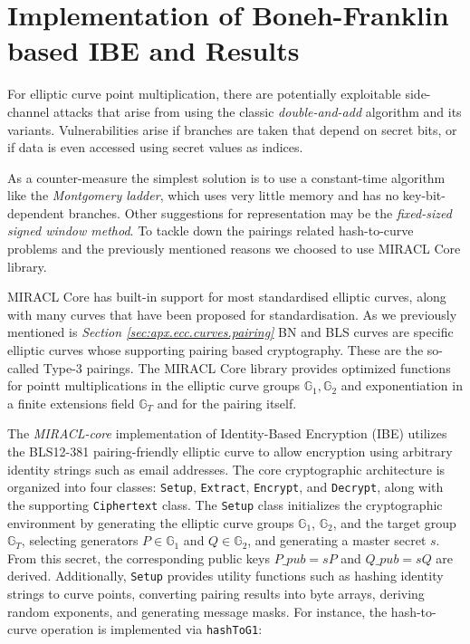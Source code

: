 \section{Implementation of Boneh-Franklin based IBE and Results }
\label{sec:bfibe.imp}


For elliptic curve point multiplication, there are potentially exploitable side-channel attacks that arise from using the classic \textit{double-and-add} algorithm and its variants. Vulnerabilities arise if branches are taken that depend on secret bits, or if data is even accessed using secret values as indices.\cite{lib.miracl.report} 

As a counter-measure the simplest solution is to use
a constant-time algorithm like the \textit{Montgomery ladder}, which  uses very little memory and has no key-bit-dependent branches. Other suggestions for representation may be the \textit{fixed-sized signed window method}. To tackle down the pairings related hash-to-curve problems and the previously mentioned reasons we choosed to use MIRACL Core library\cite{lib.miracl}. 

MIRACL Core has built-in support for most standardised elliptic curves,
along with many curves that have been proposed for standardisation. As we previously mentioned is \textit{Section \ref{sec:apx.ecc.curves.pairing}} BN and BLS curves are specific elliptic curves whose supporting pairing based cryptography. These are the so-called Type-3 pairings. The MIRACL Core library provides optimized functions for pointt multiplications in the elliptic curve groups $\mathbb{G}_1, \mathbb{G}_2$ and exponentiation in a finite extensions field $\mathbb{G}_T$ and for the pairing itself.\cite{lib.miracl.report}


The \textit{MIRACL-core}\cite{lib.miracl} implementation of Identity-Based Encryption (IBE) utilizes the BLS12-381 pairing-friendly elliptic curve to allow encryption using arbitrary identity strings such as email addresses. The core cryptographic architecture is organized into four classes: \texttt{Setup}, \texttt{Extract}, \texttt{Encrypt}, and \texttt{Decrypt}, along with the supporting \texttt{Ciphertext} class. The \texttt{Setup} class initializes the cryptographic environment by generating the elliptic curve groups $\mathbb{G}_1$, $\mathbb{G}_2$, and the target group $\mathbb{G}_T$, selecting generators $P \in \mathbb{G}_1$ and $Q \in \mathbb{G}_2$, and generating a master secret $s$. From this secret, the corresponding public keys $P\_pub = sP$ and $Q\_pub = sQ$ are derived. Additionally, \texttt{Setup} provides utility functions such as hashing identity strings to curve points, converting pairing results into byte arrays, deriving random exponents, and generating message masks. For instance, the hash-to-curve operation is implemented via \lstinline|hashToG1|\cite{lib.miracl}:

